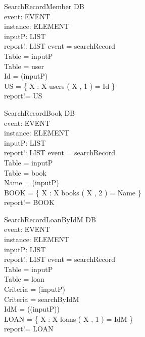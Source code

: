 \begin{schema}{SearchRecordMember}
\Delta DB \\
event: EVENT \\
instance: ELEMENT \\
inputP: LIST \\
report!: LIST
\where event = searchRecord \\
Table = \head inputP \\
Table = user \\
Id = \head (\tail inputP) \\
US = \{ X : \nat \bbar X \mem users \land \nth( X , 1 ) = Id \} \\
report!= US
\end{schema}

\begin{schema}{SearchRecordBook}
\Delta DB \\
event: EVENT \\
instance: ELEMENT \\
inputP: LIST \\
report!: LIST
\where event = searchRecord \\
Table = \head inputP \\
Table = book \\
Name = \head (\tail inputP) \\
BOOK = \{ X : \nat \bbar X \mem books \land \nth( X , 2 ) = Name \} \\
report!= BOOK
\end{schema}

\begin{schema}{SearchRecordLoanByIdM}
\Delta DB \\
event: EVENT \\
instance: ELEMENT \\
inputP: LIST \\
report!: LIST
\where event = searchRecord \\
Table = \head inputP \\
Table = loan \\
Criteria = \head (\tail inputP) \\
Criteria = searchByIdM \\
IdM = \head (\tail (\tail inputP)) \\
LOAN = \{ X : \nat \bbar X \mem loans \land \nth( X , 1 ) = IdM \} \\
report!= LOAN
\end{schema}

